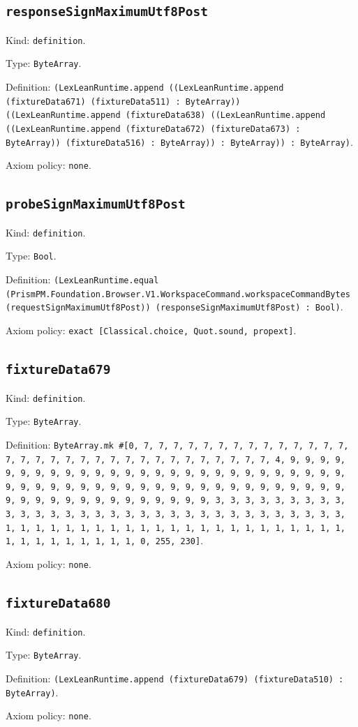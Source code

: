 \documentclass[11pt]{article}
\begin{document}
\subsection*{\texttt{responseSignMaximumUtf8Post}}
\noindent Kind: \texttt{definition}.\par
\noindent Type: \texttt{ByteArray}.\par
\noindent Definition: \texttt{(LexLeanRuntime.append ((LexLeanRuntime.append (fixtureData671) (fixtureData511) : ByteArray)) ((LexLeanRuntime.append (fixtureData638) ((LexLeanRuntime.append ((LexLeanRuntime.append (fixtureData672) (fixtureData673) : ByteArray)) (fixtureData516) : ByteArray)) : ByteArray)) : ByteArray)}.\par
\noindent Axiom policy: \texttt{none}.\par
\subsection*{\texttt{probeSignMaximumUtf8Post}}
\noindent Kind: \texttt{definition}.\par
\noindent Type: \texttt{Bool}.\par
\noindent Definition: \texttt{(LexLeanRuntime.equal (PrismPM.Foundation.Browser.V1.WorkspaceCommand.workspaceCommandBytes (requestSignMaximumUtf8Post)) (responseSignMaximumUtf8Post) : Bool)}.\par
\noindent Axiom policy: \texttt{exact [Classical.choice, Quot.sound, propext]}.\par
\subsection*{\texttt{fixtureData679}}
\noindent Kind: \texttt{definition}.\par
\noindent Type: \texttt{ByteArray}.\par
\noindent Definition: \texttt{ByteArray.mk \#[0, 7, 7, 7, 7, 7, 7, 7, 7, 7, 7, 7, 7, 7, 7, 7, 7, 7, 7, 7, 7, 7, 7, 7, 7, 7, 7, 7, 7, 7, 7, 7, 7, 4, 9, 9, 9, 9, 9, 9, 9, 9, 9, 9, 9, 9, 9, 9, 9, 9, 9, 9, 9, 9, 9, 9, 9, 9, 9, 9, 9, 9, 9, 9, 9, 9, 9, 9, 9, 9, 9, 9, 9, 9, 9, 9, 9, 9, 9, 9, 9, 9, 9, 9, 9, 9, 9, 9, 9, 9, 9, 9, 9, 9, 9, 9, 9, 9, 3, 3, 3, 3, 3, 3, 3, 3, 3, 3, 3, 3, 3, 3, 3, 3, 3, 3, 3, 3, 3, 3, 3, 3, 3, 3, 3, 3, 3, 3, 3, 3, 1, 1, 1, 1, 1, 1, 1, 1, 1, 1, 1, 1, 1, 1, 1, 1, 1, 1, 1, 1, 1, 1, 1, 1, 1, 1, 1, 1, 1, 1, 1, 1, 0, 255, 230]}.\par
\noindent Axiom policy: \texttt{none}.\par
\subsection*{\texttt{fixtureData680}}
\noindent Kind: \texttt{definition}.\par
\noindent Type: \texttt{ByteArray}.\par
\noindent Definition: \texttt{(LexLeanRuntime.append (fixtureData679) (fixtureData510) : ByteArray)}.\par
\noindent Axiom policy: \texttt{none}.\par
\end{document}
